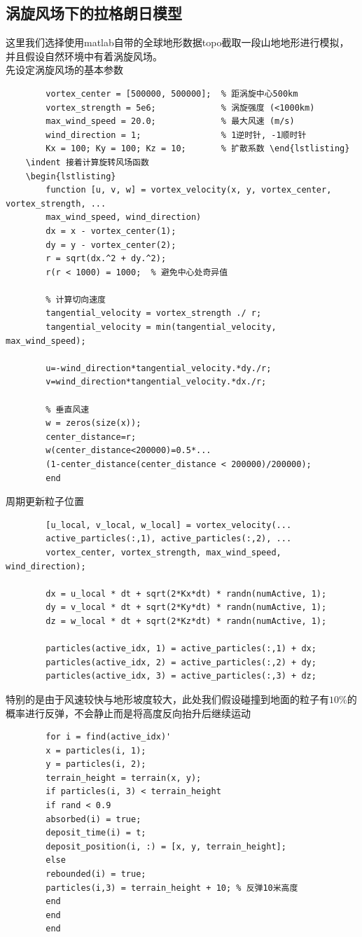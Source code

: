 \documentclass{article}
\begin{document}
	\subsection{涡旋风场下的拉格朗日模型}
	\indent 这里我们选择使用matlab自带的全球地形数据topo截取一段山地地形进行模拟，并且假设自然环境中有着涡旋风场。\\
	\indent 先设定涡旋风场的基本参数
	\begin{lstlisting}
		vortex_center = [500000, 500000];  % 距涡旋中心500km
		vortex_strength = 5e6;             % 涡旋强度 (<1000km)
		max_wind_speed = 20.0;             % 最大风速 (m/s)
		wind_direction = 1;                % 1逆时针, -1顺时针
		Kx = 100; Ky = 100; Kz = 10;       % 扩散系数 \end{lstlisting}
	\indent 接着计算旋转风场函数
	\begin{lstlisting}
		function [u, v, w] = vortex_velocity(x, y, vortex_center, vortex_strength, ...
		max_wind_speed, wind_direction)
		dx = x - vortex_center(1);
		dy = y - vortex_center(2);
		r = sqrt(dx.^2 + dy.^2);
		r(r < 1000) = 1000;  % 避免中心处奇异值
		
		% 计算切向速度
		tangential_velocity = vortex_strength ./ r;
		tangential_velocity = min(tangential_velocity, max_wind_speed);
		
		u=-wind_direction*tangential_velocity.*dy./r;
		v=wind_direction*tangential_velocity.*dx./r;
		
		% 垂直风速 
		w = zeros(size(x));
		center_distance=r;
		w(center_distance<200000)=0.5*...
		(1-center_distance(center_distance < 200000)/200000);
		end\end{lstlisting}
	\indent 周期更新粒子位置
	\begin{lstlisting}
		[u_local, v_local, w_local] = vortex_velocity(... 
		active_particles(:,1), active_particles(:,2), ...
		vortex_center, vortex_strength, max_wind_speed, wind_direction);
		
		dx = u_local * dt + sqrt(2*Kx*dt) * randn(numActive, 1);
		dy = v_local * dt + sqrt(2*Ky*dt) * randn(numActive, 1);
		dz = w_local * dt + sqrt(2*Kz*dt) * randn(numActive, 1);
		
		particles(active_idx, 1) = active_particles(:,1) + dx;
		particles(active_idx, 2) = active_particles(:,2) + dy;
		particles(active_idx, 3) = active_particles(:,3) + dz;
	\end{lstlisting}
	\indent 特别的是由于风速较快与地形坡度较大，此处我们假设碰撞到地面的粒子有$10\% $的概率进行反弹，不会静止而是将高度反向抬升后继续运动
	\begin{lstlisting}
		for i = find(active_idx)'
		x = particles(i, 1);
		y = particles(i, 2);
		terrain_height = terrain(x, y);
		if particles(i, 3) < terrain_height
		if rand < 0.9
		absorbed(i) = true;
		deposit_time(i) = t;
		deposit_position(i, :) = [x, y, terrain_height];
		else 
		rebounded(i) = true;
		particles(i,3) = terrain_height + 10; % 反弹10米高度
		end
		end
		end\end{lstlisting}
\end{document}
